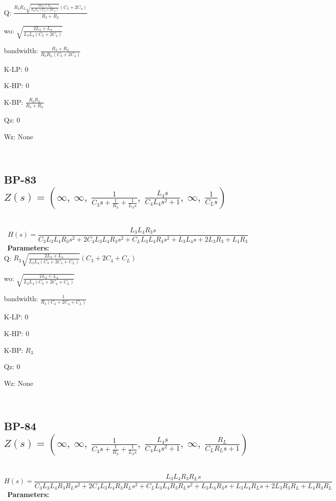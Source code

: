 \documentclass{article}
\begin{document}
Q: $\frac{R_{3} R_{L} \sqrt{\frac{2 L_{3} + L_{4}}{L_{3} L_{4} \left(C_{3} + 2 C_{4}\right)}} \left(C_{3} + 2 C_{4}\right)}{R_{3} + R_{L}}$\ 

wo: $\sqrt{\frac{2 L_{3} + L_{4}}{L_{3} L_{4} \left(C_{3} + 2 C_{4}\right)}}$\ 

bandwidth: $\frac{R_{3} + R_{L}}{R_{3} R_{L} \left(C_{3} + 2 C_{4}\right)}$\ 

K-LP: $0$\ 

K-HP: $0$\ 

K-BP: $\frac{R_{3} R_{L}}{R_{3} + R_{L}}$\ 

Qz: $0$\ 

Wz: $\text{None}$\ 

\ 

\subsection{BP-83 $Z(s) = \left( \infty, \  \infty, \  \frac{1}{C_{3} s + \frac{1}{R_{3}} + \frac{1}{L_{3} s}}, \  \frac{L_{4} s}{C_{4} L_{4} s^{2} + 1}, \  \infty, \  \frac{1}{C_{L} s}\right)$ } \ 
\textbf{\[H(s) = \frac{L_{3} L_{4} R_{3} s}{C_{3} L_{3} L_{4} R_{3} s^{2} + 2 C_{4} L_{3} L_{4} R_{3} s^{2} + C_{L} L_{3} L_{4} R_{3} s^{2} + L_{3} L_{4} s + 2 L_{3} R_{3} + L_{4} R_{3}}\] } \ 
\textbf{Parameters:}\\ 

Q: $R_{3} \sqrt{\frac{2 L_{3} + L_{4}}{L_{3} L_{4} \left(C_{3} + 2 C_{4} + C_{L}\right)}} \left(C_{3} + 2 C_{4} + C_{L}\right)$\ 

wo: $\sqrt{\frac{2 L_{3} + L_{4}}{L_{3} L_{4} \left(C_{3} + 2 C_{4} + C_{L}\right)}}$\ 

bandwidth: $\frac{1}{R_{3} \left(C_{3} + 2 C_{4} + C_{L}\right)}$\ 

K-LP: $0$\ 

K-HP: $0$\ 

K-BP: $R_{3}$\ 

Qz: $0$\ 

Wz: $\text{None}$\ 

\ 

\subsection{BP-84 $Z(s) = \left( \infty, \  \infty, \  \frac{1}{C_{3} s + \frac{1}{R_{3}} + \frac{1}{L_{3} s}}, \  \frac{L_{4} s}{C_{4} L_{4} s^{2} + 1}, \  \infty, \  \frac{R_{L}}{C_{L} R_{L} s + 1}\right)$ } \ 
\textbf{\[H(s) = \frac{L_{3} L_{4} R_{3} R_{L} s}{C_{3} L_{3} L_{4} R_{3} R_{L} s^{2} + 2 C_{4} L_{3} L_{4} R_{3} R_{L} s^{2} + C_{L} L_{3} L_{4} R_{3} R_{L} s^{2} + L_{3} L_{4} R_{3} s + L_{3} L_{4} R_{L} s + 2 L_{3} R_{3} R_{L} + L_{4} R_{3} R_{L}}\] } \ 
\textbf{Parameters:}\\ 
\end{document}
